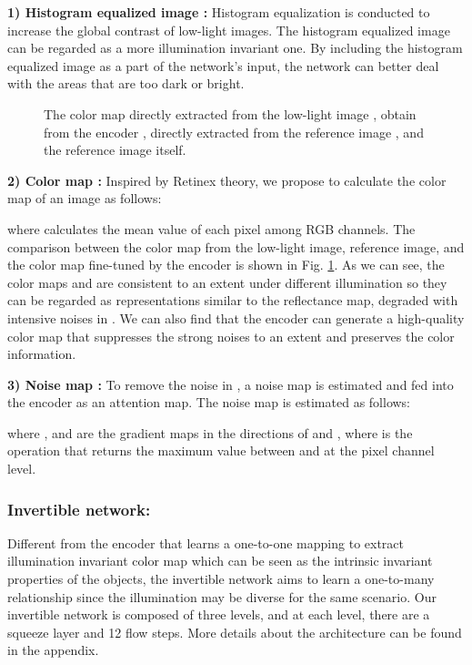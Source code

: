 \documentclass[letterpaper]{article} \usepackage{aaai22}  \usepackage{times}  \usepackage{helvet}  \usepackage{courier}  \usepackage[hyphens]{url}  \usepackage{graphicx} \urlstyle{rm} \def\UrlFont{\rm}  \usepackage{natbib}  \usepackage{caption} \usepackage{subfigure}
\newcommand{\yufei}[1]{{#1}}
\newcommand{\wh}[1]{{#1}}
\begin{document}
\textbf{\wh{1)} \yufei{Histogram equalized image}  :} Histogram equalization is conducted to increase the global contrast of low-light images. 
\wh{The histogram equalized image can be regarded as a more illumination invariant one.}
\wh{By including the histogram equalized image as a part of the network's input,} the network can better deal with \wh{the} areas that are too dark or bright.
\begin{figure}[htbp]
    \centering
    \caption{
    The color map directly extracted from the low-light image , obtain from the encoder , directly extracted from the reference image , and the reference image itself.
    }
    \label{fig:colormap}
\end{figure}

\textbf{\wh{2)} Color map :} Inspired by Retinex theory, we propose to calculate the color map of an image  as follows: 

where  \wh{calculates} the mean value of each pixel among RGB channels. 
The comparison between the color map from \wh{the low-light image}, reference image, and the color map fine-tuned by the encoder  is shown in Fig. \ref{fig:colormap}. 
As we can see, the color maps  and  are \wh{consistent to an extent} under different illumination so \wh{they} can be regarded as \wh{representations similar to the reflectance map, degraded with intensive noises in .}
We can also find that the encoder  can generate a high-quality color map that \wh{suppresses} the strong noises \wh{to an extent} and \wh{preserves} the color information.

\textbf{\wh{3)} Noise map :}
To remove the noise in , a noise map  is estimated and fed into the encoder as an attention map. The noise map  is estimated as follows:

where , \wh{and}  are the gradient \wh{maps} \wh{in} the directions of  and , \wh{where}  is the operation that \wh{returns} the maximum value between  and  at the pixel channel level.

\subsubsection{Invertible network:}
Different from the encoder that learns a one-to-one mapping to extract illumination invariant color map which can be seen as \wh{the intrinsic invariant} properties of the objects, the \yufei{invertible network} aims to learn a one-to-many relationship since the illumination may be diverse for the same scenario. Our invertible network is composed of three levels, and \wh{at} each level, there are a squeeze layer and 12 flow steps. More details about the architecture can be found in the appendix.
\end{document}
